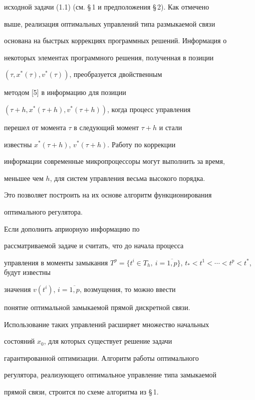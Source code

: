 исходной задачи (1.1) (см. \S\,1 и предположения \S\,2). Как отмечено


выше, реализация оптимальных управлений типа размыкаемой связи


основана на быстрых коррекциях программных решений. Информация о


некоторых элементах программного решения, полученная в позиции


$(\tau,x^{*}(\tau),v^{*}(\tau))$, преобразуется двойственным


методом [5] в информацию для позиции


$(\tau+h,x^*(\tau+h),v^*(\tau+h))$, когда процесс управления


перешел от момента $\tau$ в следующий момент $\tau+h$ и стали


известны $x^{*}(\tau+h)$, $v^{*}(\tau+h)$. Работу по коррекции


информации современные микропроцессоры могут выполнить за время,


меньшее чем $h$, для систем управления весьма высокого порядка.


Это позволяет построить на их основе алгоритм функционирования


оптимального регулятора.





\begin{notes}


Если дополнить априорную информацию по


рассматриваемой задаче и считать, что до начала процесса


управления в моменты замыкания $T^p=\{t^i \in T_{h},


\ i=\overline{1,p}\}$, $t_{*}<t^1< \dotsb < t^p < t^*$, будут известны


значения $v(t^i)$, $i=\overline{1,p}$, возмущения, то можно ввести


понятие оптимальной замыкаемой прямой дискретной связи.


Использование таких управлений расширяет множество начальных


состояний $x_{0}$, для которых существует решение задачи


гарантированной оптимизации. Алгоритм работы оптимального


регулятора, реализующего оптимальное управление типа замыкаемой


прямой связи, строится по схеме алгоритма из \S\,1.


\end{notes}





